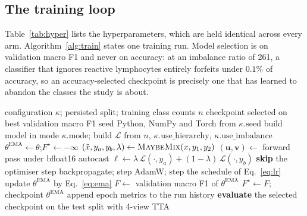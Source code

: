 \documentclass[11pt,a4paper]{article}
\begin{document}
\subsection{The training loop}

Table~\ref{tab:hyper} lists the hyperparameters, which are held identical across
every arm. Algorithm~\ref{alg:train} states one training run. Model selection is
on validation macro F1 and never on accuracy: at an imbalance ratio of 261, a
classifier that ignores reactive lymphocytes entirely forfeits under $0.1\%$ of
accuracy, so an accuracy-selected checkpoint is precisely one that has learned to
abandon the classes the study is about.

\begin{algorithm}[H]
\caption{One training run}
\label{alg:train}
\begin{algorithmic}[1]
\Require configuration $\kappa$; persisted split; training class counts $n$
\Ensure checkpoint selected on best validation macro F1
\State seed Python, NumPy and Torch from $\kappa.\text{seed}$
\State build model in mode $\kappa.\text{mode}$; build $\mathcal{L}$ from $n$, $\kappa.\text{use\_hierarchy}$, $\kappa.\text{use\_imbalance}$
\State $\theta^{\text{EMA}} \gets \theta$;\quad $F^{\star} \gets -\infty$
    \State $(\tilde{x}, y_a, y_b, \lambda) \gets \textproc{MaybeMix}(x, y_1, y_2)$ 
    \State $(\mathbf{u}, \mathbf{v}) \gets$ forward pass under bfloat16 autocast
    \State $\ell \gets \lambda\,\mathcal{L}(\cdot, y_a) + (1-\lambda)\,\mathcal{L}(\cdot, y_b)$ 
      \State \textbf{skip} the optimiser step 
    \Else
      \State backpropagate; step AdamW; step the schedule of Eq.~\eqref{eq:lr}
      \State update $\theta^{\text{EMA}}$ by Eq.~\eqref{eq:ema}
    \EndIf
  \EndFor
  \State $F \gets$ validation macro F1 of $\theta^{\text{EMA}}$
   \State $F^{\star} \gets F$; checkpoint $\theta^{\text{EMA}}$ \EndIf
  \State append epoch metrics to the run history
\EndFor
\State \textbf{evaluate} the selected checkpoint on the test split with 4-view TTA
\end{algorithmic}
\end{algorithm}
\end{document}
